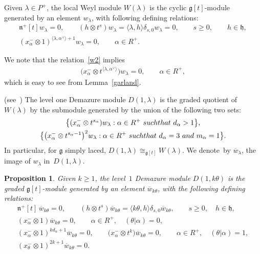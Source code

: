 \documentclass[10pt,a4paper]{amsart}
\newtheorem{proposition}{Proposition}
\begin{document}
\begin{definition}
Given $\lambda \in P^+$, the local Weyl module $W(\lambda)$ is the cyclic $\mathfrak{g}[t]$-module generated by an
element $w_\lambda$, with following def\/ining relations:
\begin{gather}
\mathfrak{n}^{+}[t]  w_\lambda=0,
\qquad
(h \otimes t^s)  w_\lambda = \langle \lambda, h \rangle \delta_{s,0} w_\lambda=0,
\qquad
s\geq0,
\qquad
h\in\mathfrak{h},
\nonumber
\\
(x^{-}_\alpha \otimes 1)^{\langle \lambda,
\alpha^{\vee} \rangle + 1}w_\lambda=0,
\qquad
\alpha \in R^{+}.
\label{w2}
\end{gather}
\end{definition}
\noindent We note that the relation~\eqref{w2} implies
\begin{gather}
\label{w2'}
\big(x^{-}_\alpha \otimes t^{\langle \lambda,
\alpha^{\vee} \rangle}\big)  w_\lambda=0,
\qquad
\alpha \in R^{+},
\end{gather}
which is easy to see from Lemma~\ref{garland}.

\begin{definition}
\textup{(see~\cite[Corollary 3.5]{CV})} The level one Demazure module $D(1,\lambda)$ is the graded quotient of
$W(\lambda)$ by the submodule generated by the union of the following two sets:
\begin{gather}
\big\{(x^{-}_{\alpha} \otimes t^{s_{\alpha}})  w_{\lambda}: \alpha\in R^{+}~\textup{such that}~d_{\alpha} > 1\big\},
\label{dm1}
\\
\big\{\big(x^{-}_{\alpha} \otimes t^{s_{\alpha}-1}\big)^2  w_{\lambda}: \alpha\in R^{+}~\textup{such that}~d_\alpha =3~\textup{and}~m_\alpha=1\big\}.
\label{dm2}
\end{gather}
In particular, for $\mathfrak{g}$ simply laced, $D(1,\lambda)\cong_{\mathfrak{g}[t]} W(\lambda)$. We denote~by
$\overline{w}_\lambda$, the image of $w_\lambda$ in~$D(1,\lambda)$.
\end{definition}

\begin{proposition}
\label{WvsD}
Given $k\geq 1$, the level~$1$ Demazure module $D(1,k\theta)$ is the graded $\mathfrak{g}[t]$-module generated by an
element $\overline{w}_{k\theta}$, with the following defining relations:
\begin{gather*}
\mathfrak{n}^{+}[t]\, \overline{w}_{k\theta}=0,
\qquad
(h \otimes t^s) \overline{w}_{k\theta} = \langle k\theta, h\rangle \delta_{s,0} \overline{w}_{k\theta},
\qquad
s\geq0,
\quad
h\in\mathfrak{h},
\\
(x^{-}_{\alpha}\otimes 1) \overline{w}_{k\theta}=0,
\qquad
\alpha\in R^+,
\quad
(\theta|\alpha)=0,
\\
(x^{-}_{\alpha} \otimes 1)^{kd_{\alpha}+1} \overline{w}_{k\theta}=0,
\qquad
\big(x^{-}_{\alpha} \otimes t^k\big) \overline{w}_{k\theta}=0,
\qquad
\alpha\in R^+,
\quad
(\theta|\alpha)=1,
\\
(x^{-}_{\theta} \otimes 1)^{2k+1} \overline{w}_{k\theta}=0.
\end{gather*}
\end{proposition}
\end{document}
